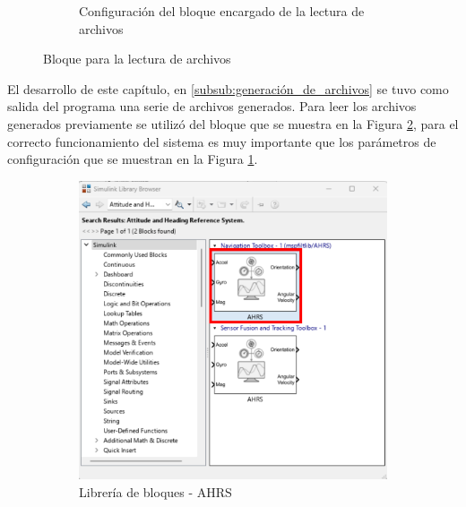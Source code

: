 \begin{figure}[htbp]
\begin{subfigure}[b]{0.45\textwidth}
        \caption{Configuración del bloque encargado de la lectura de archivos}
        \label{fig:config_from_file_IMU}
    \end{subfigure}
    \caption{Bloque para la lectura de archivos}
    \label{fig:read_from_file}
\end{figure}

El desarrollo de este capítulo, en \ref{subsub:generación_de_archivos} se tuvo como salida del programa una serie de archivos generados. Para  leer los archivos generados previamente se utilizó del bloque que se muestra en la Figura \ref{fig:read_from_file}, para el correcto funcionamiento del sistema es muy importante que los parámetros de configuración que se muestran en la Figura \ref{fig:config_from_file_IMU}.
\newpage

\begin{figure}[htbp]
    \centering
    \begin{subfigure}[b]{0.35\textwidth}
        \centering
        \includegraphics[width=\textwidth]{fig/Capitulo5/Caso_de_estudio_IMU/Generador_de_salidas/libreira_de_bloques_sensor_AHRS.pdf}
        \caption{Librería de bloques - AHRS}
        \label{fig:lib_bloques_AHRS}
    \end{subfigure}
    \hfill
    \begin{subfigure}[b]{0.45\textwidth}
        \centering

\end{subfigure}
\end{figure}
